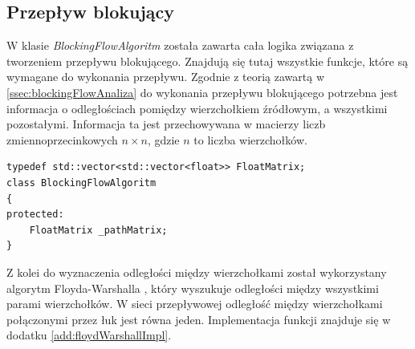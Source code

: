 \subsection{Przepływ blokujący}\label{ssec:blockingFlowWew}
W klasie \emph{BlockingFlowAlgoritm} została zawarta cała logika związana z tworzeniem przepływu blokującego. Znajdują się tutaj wszystkie funkcje, które są wymagane do wykonania przepływu. Zgodnie z teorią zawartą w \ref{ssec:blockingFlowAnaliza} do wykonania przepływu blokującego potrzebna jest informacja o odległościach pomiędzy wierzchołkiem źródłowym, a wszystkimi pozostałymi. Informacja ta jest przechowywana w macierzy liczb zmiennoprzecinkowych $ n\times n $, gdzie $ n $ to liczba wierzchołków.
\begin{verbatim}
typedef std::vector<std::vector<float>> FloatMatrix;
class BlockingFlowAlgoritm
{
protected:
	FloatMatrix _pathMatrix;
}
\end{verbatim}
Z kolei do wyznaczenia odległości między wierzchołkami został wykorzystany algorytm Floyda-Warshalla \cite{id:AlgorytmyStruktury}, który wyszukuje odległości między wszystkimi parami wierzchołków. W sieci przepływowej odległość między wierzchołkami połączonymi przez łuk jest równa jeden. Implementacja funkcji znajduje się w dodatku \ref{add:floydWarshallImpl}.


